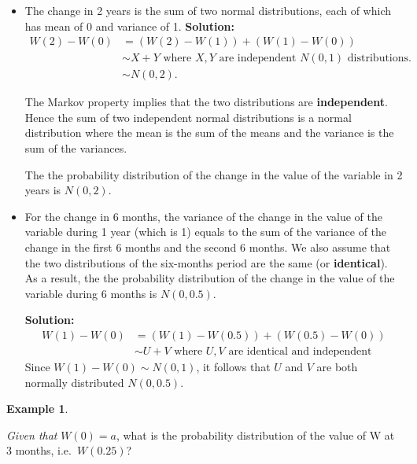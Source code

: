 \documentclass[
]{book}
\theoremstyle{definition}
\theoremstyle{definition}
\newtheorem{example}{Example}[chapter]
\theoremstyle{definition}
\theoremstyle{definition}
\theoremstyle{remark}
\begin{document}
\begin{itemize}
  \begin{itemize}
  \item
    The change in 2 years is the sum of two normal distributions,
    each of which has mean of 0 and variance of 1. \textbf{Solution:}
    \[\begin{aligned}
        W(2) - W(0) &= (W(2) - W(1)) +  (W(1) - W(0)) \\
                  &\sim X + Y \text{ where } X, Y \text{ are independent } N(0,1)                   \text{ distributions.}  \\
                  &\sim N(0,2).\end{aligned}\]

    The Markov property implies that the two distributions are
    \textbf{independent}. Hence the sum of two independent normal
    distributions is a normal distribution where the mean is the sum
    of the means and the variance is the sum of the variances.

    The the probability distribution of the change in the value of
    the variable in 2 years is \(N(0,2)\).
  \item
    For the change in 6 months, the variance of the change in the
    value of the variable during 1 year (which is 1) equals to the
    sum of the variance of the change in the first 6 months and the
    second 6 months. We also assume that the two distributions of
    the six-months period are the same (or \textbf{identical}). As a
    result, the the probability distribution of the change in the
    value of the variable during 6 months is \(N(0,0.5)\).

    \textbf{Solution:} \[\begin{aligned}
        W(1) - W(0) &= (W(1) - W(0.5)) +  (W(0.5) - W(0)) \\
                  &\sim U + V \text{ where } U, V \text{ are identical and independent}\end{aligned}\]
    Since \(W(1) - W(0) \sim N(0,1)\), it follows that \(U\) and \(V\) are
    both normally distributed \(N(0,0.5)\).
  \end{itemize}
\end{itemize}

\begin{example}
\protect\hypertarget{exm:unlabeled-div-74}{}\label{exm:unlabeled-div-74}

\emph{Given that} \(W(0) = a\), what is the probability distribution of the
value of W at 3 months, i.e.~\(W(0.25)\)?

\end{example}
\end{document}
